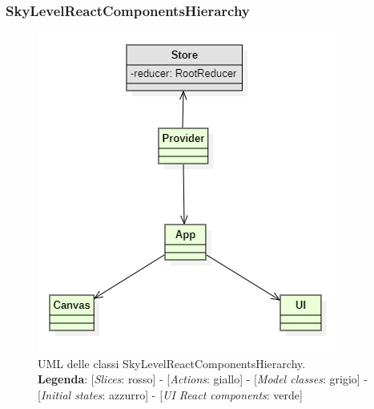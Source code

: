 \subsubsection{SkyLevelReactComponentsHierarchy}
\begin{figure}[H]
	\centering
	\includegraphics[scale=0.75, keepaspectratio]{./res/images/SkyLevelReactComponentHierarchy.PNG}
	\caption[UML delle classi SkyLevelReactComponentsHierarchy]{
	UML delle classi SkyLevelReactComponentsHierarchy.
	\\
	\textbf{Legenda}: 
	[\textit{Slices}: rosso] -
	[\textit{Actions}: giallo] -
	[\textit{Model classes}: grigio] -
	[\textit{Initial states}: azzurro] -
	[\textit{UI React components}: verde]}
\end{figure}

